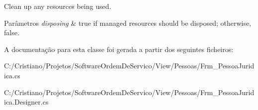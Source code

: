 Clean up any resources being used. 


\begin{DoxyParams}{Parâmetros}
{\em disposing} & true if managed resources should be disposed; otherwise, false.\\
\hline
\end{DoxyParams}


A documentação para esta classe foi gerada a partir dos seguintes ficheiros\+:\begin{DoxyCompactItemize}
\item 
C\+:/\+Cristiano/\+Projetos/\+Software\+Ordem\+De\+Servico/\+View/\+Pessoas/Frm\+\_\+\+Pessoa\+Juridica.\+cs\item 
C\+:/\+Cristiano/\+Projetos/\+Software\+Ordem\+De\+Servico/\+View/\+Pessoas/Frm\+\_\+\+Pessoa\+Juridica.\+Designer.\+cs\end{DoxyCompactItemize}
